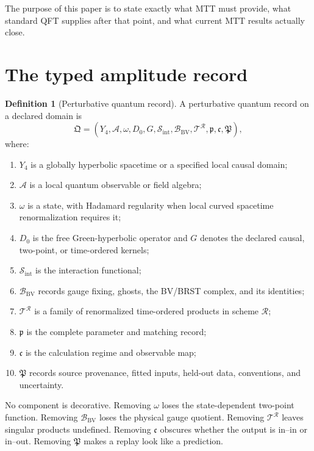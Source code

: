 \documentclass[11pt,a4paper]{article}
\numberwithin{equation}{section}
\theoremstyle{definition}
\newtheorem{definition}[theorem]{Definition}
\theoremstyle{remark}
\newcommand{\BV}{\mathrm{BV}}
\newcommand{\cA}{\mathcal A}
\newcommand{\cB}{\mathcal B}
\newcommand{\cS}{\mathcal S}
\newcommand{\cT}{\mathcal T}
\newcommand{\cR}{\mathcal R}
\begin{document}
The purpose of this paper is to state exactly what MTT must provide, what
standard QFT supplies after that point, and what current MTT results
actually close.

\section{The typed amplitude record}

\begin{definition}[Perturbative quantum record]
\label{def:record}
A perturbative quantum record on a declared domain is
\[
\mathfrak Q=
(Y_4,\cA,\omega,D_0,G,\cS_{\mathrm{int}},
\cB_{\BV},\cT^{\cR},\mathfrak p,\mathfrak c,\mathfrak P),
\]
where:
\begin{enumerate}
\item \(Y_4\) is a globally hyperbolic spacetime or a specified local
causal domain;
\item \(\cA\) is a local quantum observable or field algebra;
\item \(\omega\) is a state, with Hadamard regularity when local curved
spacetime renormalization requires it;
\item \(D_0\) is the free Green-hyperbolic operator and \(G\) denotes the
declared causal, two-point, or time-ordered kernels;
\item \(\cS_{\mathrm{int}}\) is the interaction functional;
\item \(\cB_{\BV}\) records gauge fixing, ghosts, the BV/BRST complex,
and its identities;
\item \(\cT^{\cR}\) is a family of renormalized time-ordered products in
scheme \(\cR\);
\item \(\mathfrak p\) is the complete parameter and matching record;
\item \(\mathfrak c\) is the calculation regime and observable map;
\item \(\mathfrak P\) records source provenance, fitted inputs, held-out
data, conventions, and uncertainty.
\end{enumerate}
\end{definition}

No component is decorative.  Removing \(\omega\) loses the state-dependent
two-point function.  Removing \(\cB_{\BV}\) loses the physical gauge
quotient.  Removing \(\cT^{\cR}\) leaves singular products undefined.
Removing \(\mathfrak c\) obscures whether the output is in--in or in--out.
Removing \(\mathfrak P\) makes a replay look like a prediction.
\end{document}

